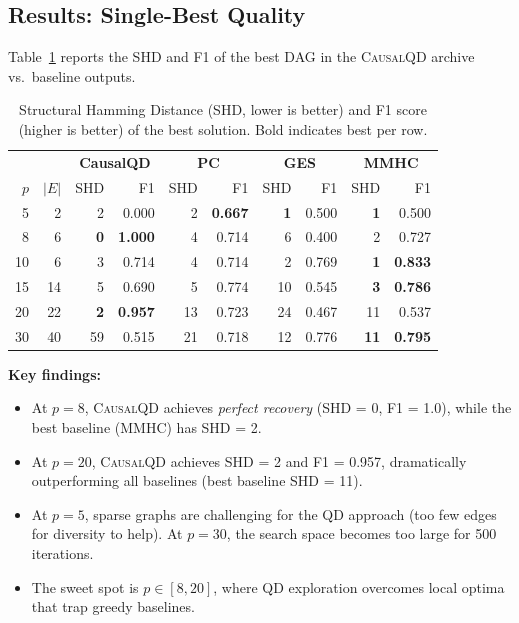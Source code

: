 \documentclass[11pt,a4paper]{article}
\begin{document}
\subsection{Results: Single-Best Quality}

Table~\ref{tab:shd} reports the SHD and F1 of the best DAG in the \textsc{CausalQD} archive vs.\ baseline outputs.

\begin{table}[t]
\centering
\caption{Structural Hamming Distance (SHD, lower is better) and F1 score (higher is better) of the best solution. Bold indicates best per row.}
\label{tab:shd}
\begin{tabular}{@{}rr|rr|rr|rr|rr@{}}
\toprule
& & \multicolumn{2}{c|}{\textbf{CausalQD}} & \multicolumn{2}{c|}{\textbf{PC}} & \multicolumn{2}{c|}{\textbf{GES}} & \multicolumn{2}{c}{\textbf{MMHC}} \\
$p$ & $|E|$ & SHD & F1 & SHD & F1 & SHD & F1 & SHD & F1 \\
\midrule
5 & 2 & 2 & 0.000 & 2 & \textbf{0.667} & \textbf{1} & 0.500 & \textbf{1} & 0.500 \\
8 & 6 & \textbf{0} & \textbf{1.000} & 4 & 0.714 & 6 & 0.400 & 2 & 0.727 \\
10 & 6 & 3 & 0.714 & 4 & 0.714 & 2 & 0.769 & \textbf{1} & \textbf{0.833} \\
15 & 14 & 5 & 0.690 & 5 & 0.774 & 10 & 0.545 & \textbf{3} & \textbf{0.786} \\
20 & 22 & \textbf{2} & \textbf{0.957} & 13 & 0.723 & 24 & 0.467 & 11 & 0.537 \\
30 & 40 & 59 & 0.515 & 21 & 0.718 & 12 & 0.776 & \textbf{11} & \textbf{0.795} \\
\bottomrule
\end{tabular}
\end{table}

\textbf{Key findings:}
\begin{itemize}[leftmargin=*]
    \item At $p = 8$, \textsc{CausalQD} achieves \emph{perfect recovery} (SHD = 0, F1 = 1.0), while the best baseline (MMHC) has SHD = 2.
    \item At $p = 20$, \textsc{CausalQD} achieves SHD = 2 and F1 = 0.957, dramatically outperforming all baselines (best baseline SHD = 11).
    \item At $p = 5$, sparse graphs are challenging for the QD approach (too few edges for diversity to help). At $p = 30$, the search space becomes too large for 500 iterations.
    \item The sweet spot is $p \in [8, 20]$, where QD exploration overcomes local optima that trap greedy baselines.
\end{itemize}
\end{document}
